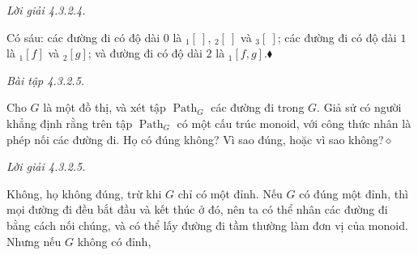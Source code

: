 \noindent\textit{Lời giải 4.3.2.4.}\keepwithnext

Có sáu: các đường đi có độ dài $0$ là ${}_1[\ ]$, ${}_2[\ ]$ và ${}_3[\ ]$; các đường đi có độ dài $1$ là ${}_1[f]$ và ${}_2[g]$; và đường đi có độ dài $2$ là ${}_1[f,g]$.\hfill$\blacklozenge$

\noindent\textit{Bài tập 4.3.2.5.}\keepwithnext

Cho $G$ là một đồ thị, và xét tập $\operatorname{Path}_G$ các đường đi trong $G$. Giả sử có người khẳng định rằng trên tập $\operatorname{Path}_G$ có một cấu trúc monoid, với công thức nhân là phép nối các đường đi. Họ có đúng không? Vì sao đúng, hoặc vì sao không?\hfill$\diamond$

\noindent\textit{Lời giải 4.3.2.5.}\keepwithnext

Không, họ không đúng, trừ khi $G$ chỉ có một đỉnh. Nếu $G$ có đúng một đỉnh, thì mọi đường đi đều bắt đầu và kết thúc ở đó, nên ta có thể nhân các đường đi bằng cách nối chúng, và có thể lấy đường đi tầm thường làm đơn vị của monoid. Nhưng nếu $G$ không có đỉnh,

